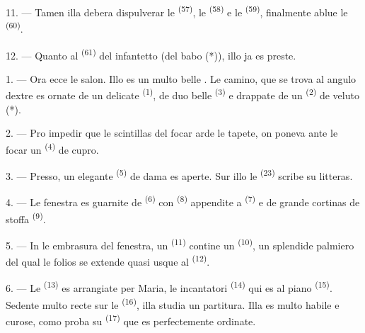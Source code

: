 

11. --- Tamen illa debera dispulverar le 
\textsuperscript{(57)}, le  \textsuperscript{(58)} e le
 \textsuperscript{(59)}, finalmente ablue le
 \textsuperscript{(60)}.

12. --- Quanto al  \textsuperscript{(61)} del infantetto (del babo
(*)), illo ja es preste.

\VUsaut{5.0mm}
\VUsaut{3.0mm}

1. --- Ora ecce le salon. Illo es un multo belle . Le camino, que
se trova al angulo dextre es ornate de un delicate 
\textsuperscript{(1)}, de duo belle  \textsuperscript{(3)} e
drappate de un  \textsuperscript{(2)} de veluto (*).

2. --- Pro impedir que le scintillas del focar arde le tapete, on poneva ante le
focar un  \textsuperscript{(4)} de cupro.

3. --- Presso, un elegante  \textsuperscript{(5)} de dama es
aperte. Sur illo le  \textsuperscript{(23)} scribe su
litteras.

4. --- Le fenestra es guarnite de 
\textsuperscript{(6)} con  \textsuperscript{(8)} appendite a
 \textsuperscript{(7)} e de grande cortinas de stoffa
 \textsuperscript{(9)}.

5. --- In le embrasura del fenestra, un 
\textsuperscript{(11)} contine un  \textsuperscript{(10)},
un splendide palmiero del qual le folios se extende quasi usque al
 \textsuperscript{(12)}.

6. --- Le  \textsuperscript{(13)} es arrangiate per
Maria, le incantatori  \textsuperscript{(14)} qui es al piano
\textsuperscript{(15)}. Sedente multo recte sur le 
\textsuperscript{(16)}, illa studia un partitura. Illa es multo habile e curose,
como proba su  \textsuperscript{(17)} que es
perfectemente ordinate.


